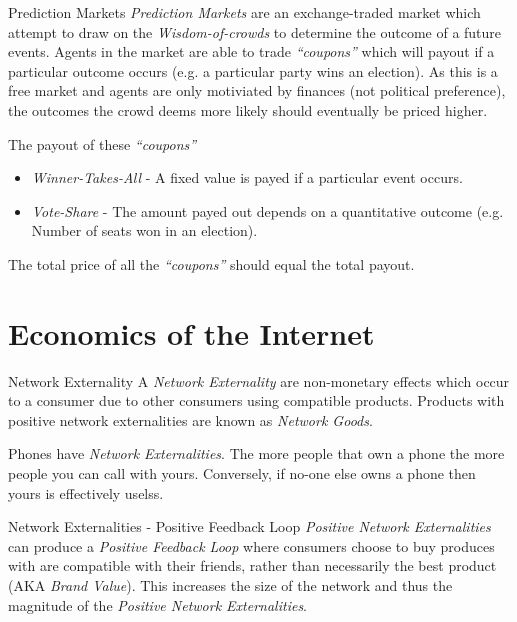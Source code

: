 \documentclass[11pt,a4paper]{article}
\begin{document}
  \begin{definition}{Prediction Markets}
    \textit{Prediction Markets} are an exchange-traded market which attempt to draw on the \textit{Wisdom-of-crowds} to determine the outcome of a future events. Agents in the market are able to trade \textit{``coupons''} which will payout if a particular outcome occurs (e.g. a particular party wins an election). As this is a free market and agents are only motiviated by finances (not political preference), the outcomes the crowd deems more likely should eventually be priced higher.
    \par The payout of these \textit{``coupons''}
    \begin{itemize}
      \item \textit{Winner-Takes-All} - A fixed value is payed if a particular event occurs.
      \item \textit{Vote-Share} - The amount payed out depends on a quantitative outcome (e.g. Number of seats won in an election).
    \end{itemize}
    The total price of all the \textit{``coupons''} should equal the total payout.
  \end{definition}

\section{Economics of the Internet}\label{sec_EconomicsOfTheInternet}

  \begin{definition}{Network Externality}
    A \textit{Network Externality} are non-monetary effects which occur to a consumer due to other consumers using compatible products. Products with positive network externalities are known as \textit{Network Goods}.
    \par Phones have \textit{Network Externalities}. The more people that own a phone the more people you can call with yours. Conversely, if no-one else owns a phone then yours is effectively uselss.
  \end{definition}

  \begin{remark}{Network Externalities - Positive Feedback Loop}
    \textit{Positive Network Externalities} can produce a \textit{Positive Feedback Loop} where consumers choose to buy produces with are compatible with their friends, rather than necessarily the best product (AKA \textit{Brand Value}). This increases the size of the network and thus the magnitude of the \textit{Positive Network Externalities}.
  \end{remark}
\end{document}

